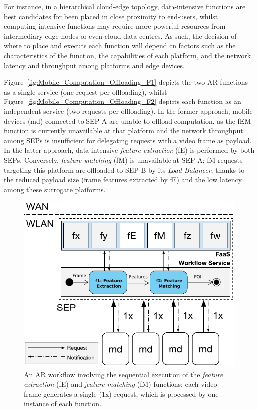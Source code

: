 \documentclass[letterpaper, 10 pt, conference]{ieeeconf}  %
\begin{document}
For instance, in a hierarchical cloud-edge topology, data-intensive functions are best candidates for been placed in close proximity to end-users, whilst computing-intensive functions may require more powerful resources from intermediary edge nodes or even cloud data centres. As such, the decision of where to place and execute each function will depend on factors such as the characteristics of the function, the capabilities of each platform, and the network latency and throughput among platforms and edge devices. 

Figure~\ref{fig:Mobile_Computation_Offloading_F1} depicts the two AR functions as a single service (one request per offloading), whilst Figure~\ref{fig:Mobile_Computation_Offloading_F2} depicts each function as an independent service (two requests per offloading). 
In the former approach, mobile devices (md) connected to SEP A are unable to offload computation, as the fEM function is currently unavailable at that platform and the network throughput among SEPs is insufficient for delegating requests with a video frame as payload.
In the latter approach, data-intensive \textit{feature extraction} (fE) is performed by both SEPs. Conversely, \textit{feature matching} (fM) is unavailable at SEP A; fM requests targeting this platform are offloaded to SEP B by its \textit{Load Balancer},
thanks to the reduced payload size (frame features extracted by fE) and the low latency among these surrogate platforms. 




\begin{figure}[tbp]
	\centering
	\includegraphics[width=\linewidth]{Figs/Mobile_Computation_Offloading_Workflow.pdf}
	\caption{An AR workflow involving the sequential execution of the \textit{feature extraction} (fE) and \textit{feature matching} (fM) functions; each video frame generates a single (1x) request, which is processed by one instance of each function.} 
	\label{fig:Mobile_Computation_Offloading_Workflow}
\end{figure}
\end{document}

